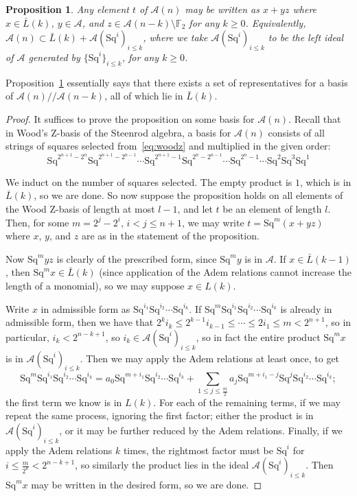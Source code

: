 \documentclass{article}
\newcommand{\A}{\mathcal{A}}
\newcommand{\F}{\mathbb{F}}
\newcommand{\Sq}{\mathrm{Sq}}
\newcommand{\mmod}{/\!/\!}
\renewcommand{\L}{\bar{L}}
\newtheorem{prop}{Proposition}
\begin{document}
\begin{prop}\label{prop:set-of-reps}
  Any element $t$ of $\A(n)$ may be written as $x + yz$ where $x\in \L(k)$, $y\in \A$, and $z\in\A(n-k)\setminus \F_2$ for any $k\geq 0$.  Equivalently, $\A(n)\subset \L(k) + \A(\Sq^i)_{i\leq k}$, where we take $\A(\Sq^i)_{i\leq k}$ to be the left ideal of $\A$ generated by $\{\Sq^i\}_{i\leq k}$, for any $k\geq 0$.
\end{prop}

Proposition~\ref{prop:set-of-reps} essentially says that there exists a set of representatives for a basis of $\A(n)\mmod\A(n-k)$, all of which lie in $\L(k)$.

\begin{proof}
  It suffices to prove the proposition on some basis for $\A(n)$.  Recall that in Wood's Z-basis of the Steenrod algebra, a basis for $\A(n)$ consists of all strings of squares selected from~\eqref{eq:woodz} and multiplied in the given order:
  \begin{equation} \label{eq:woodz}
    \Sq^{2^{n+1}-2^n}\Sq^{2^{n+1}-2^{n-1}}\cdots\Sq^{2^{n+1}-1} \Sq^{2^n-2^{n-1}}\cdots\Sq^{2^n-1}\cdots\Sq^2\Sq^3\Sq^1
  \end{equation}

  We induct on the number of squares selected.  The empty product is $1$, which is in $\L(k)$, so we are done.  So now suppose the proposition holds on all elements of the Wood Z-basis of length at most $l-1$, and let $t$ be an element of length $l$.  Then, for some $m=2^j-2^i$, $i<j\leq n+1$, we may write $t=\Sq^m\left(x+yz\right)$ where $x$, $y$, and $z$ are as in the statement of the proposition.

  Now $\Sq^myz$ is clearly of the prescribed form, since $\Sq^my$ is in $\A$.  If $x\in\L(k-1)$, then $\Sq^m x\in \L(k)$ (since application of the Adem relations cannot increase the length of a monomial), so we may suppose $x\in L(k)$.

  Write $x$ in admissible form as $\Sq^{i_1}\Sq^{i_2}\cdots\Sq^{i_k}$.  If $\Sq^m\Sq^{i_1}\Sq^{i_2}\cdots\Sq^{i_k}$ is already in admissible form, then we have that $2^ki_k\leq 2^{k-1}i_{k-1}\leq\cdots\leq2i_1\leq m<2^{n+1}$, so in particular, $i_k<2^{n-k+1}$, so $i_k\in\A(\Sq^i)_{i\leq k}$, so in fact the entire product $\Sq^mx$ is in $\A(\Sq^i)_{i\leq k}$.  Then we may apply the Adem relations at least once, to get
  \[\Sq^m\Sq^{i_1}\Sq^{i_2}\cdots\Sq^{i_k} = a_0\Sq^{m+i_1}\Sq^{i_2}\cdots\Sq^{i_k} + \sum_{1\leq j\leq \frac{m}2}a_j\Sq^{m+i_1-j}\Sq^j\Sq^{i_2}\cdots\Sq^{i_k};\]
  the first term we know is in $L(k)$.  For each of the remaining terms, if we may repeat the same process, ignoring the first factor; either the product is in $\A(\Sq^i)_{i\leq k}$, or it may be further reduced by the Adem relations.  Finally, if we apply the Adem relations $k$ times, the rightmost factor must be $\Sq^i$ for $i\leq \frac{m}{2^k}<2^{n-k+1}$, so similarly the product lies in the ideal $\A(\Sq^i)_{i\leq k}$.  Then $\Sq^mx$ may be written in the desired form, so we are done.
\end{proof}
\end{document}
